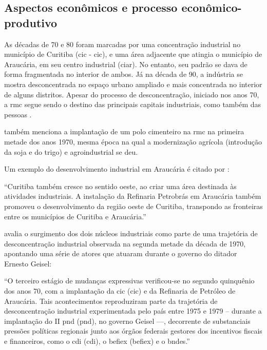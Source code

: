 	\subsection{Aspectos econômicos e processo econômico-produtivo}
	
	As décadas de 70 e 80 foram marcadas por uma concentração industrial no município de Curitiba (\glsdesc{cic} - \gls{cic}), e uma área adjacente que atingia o município de Araucária, em seu centro industrial (\gls{ciar}). No entanto, seu padrão se dava de forma fragmentada no interior de ambos. Já na década de 90, a indústria se mostra desconcentrada no espaço urbano ampliado e mais concentrada no interior de alguns distritos. Apesar do processo de desconcentração, iniciado nos anos 70, a \gls{rmc} segue sendo o destino das principais capitais industriais, como também das pessoas \cite{firkowski2002b}.
	
	 também menciona a implantação de um polo cimenteiro na \glsdesc{rmc} na primeira metade dos anos 1970, mesma época na qual a modernização agrícola (introdução da soja e do trigo) e agroindustrial se deu.
	
	Um exemplo do desenvolvimento industrial em Araucária é citado por :
	
	\begin{citacao}
		``Curitiba também cresce no sentido oeste, ao criar uma área destinada às atividades industriais. A instalação da Refinaria Petrobrás em Araucária também promoveu o desenvolvimento da região oeste de Curitiba, transpondo as fronteiras entre os municípios de Curitiba e Araucária.''
	\end{citacao}
	
	 avalia o surgimento dos dois núcleos industriais como parte de uma trajetória de desconcentração industrial observada na segunda metade da década de 1970, apontando uma série de atores que atuaram durante o governo do ditador Ernesto Geisel:
	
	\begin{citacao}
		``O terceiro estágio de mudanças expressivas verificou-se no segundo quinquênio dos anos 70, com a implantação da \glsdesc{cic} (\gls{cic}) e da Refinaria de Petróleo de Araucária. Tais acontecimentos reproduziram parte da trajetória de desconcentração industrial experimentada pelo país entre 1975 e 1979 – durante a implantação do II \glsdesc{pnd} (\gls{pnd}), no governo Geisel ---, decorrente de substanciais pressões políticas regionais junto aos órgãos federais gestores dos incentivos fiscais e financeiros, como o \glsdesc{cdi} (\gls{cdi}), o \glsdesc{befiex}
		(\gls{befiex}) e o \gls{bndes}.'' \cite[p. 62]{lourenco2009a}
	\end{citacao}

